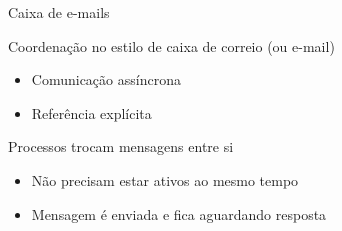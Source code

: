 \documentclass[compress]{beamer}
\begin{document}
\begin{frame}{Caixa de e-mails}

Coordenação no estilo de caixa de correio (ou e-mail)
\begin{itemize}
    \item Comunicação assíncrona
    \item Referência explícita
\end{itemize}

\vspace{0.5cm}

Processos trocam mensagens entre si
\begin{itemize}
    \item Não precisam estar ativos ao mesmo tempo
    \item Mensagem é enviada e fica aguardando resposta
\end{itemize}

\end{frame}

\end{document}
